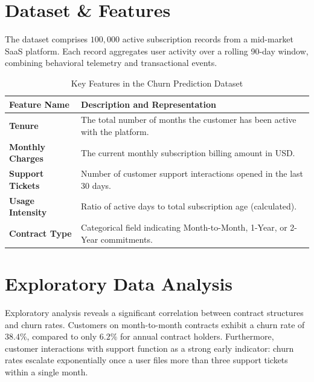 \documentclass[11pt, a4paper]{article}
\begin{document}
\section{Dataset \& Features}
The dataset comprises $100,000$ active subscription records from a mid-market SaaS platform. Each record aggregates user activity over a rolling 90-day window, combining behavioral telemetry and transactional events.

\begin{table}[h]
\centering
\begingroup
\setlength{\parindent}{0pt}
\setlength{\parskip}{0pt}
\caption{Key Features in the Churn Prediction Dataset}
\label{tab:features}
\vspace{0.5em}
\begin{tabularx}{\linewidth}{@{}>{\color{accentdark}\bfseries}l @{\hspace{8mm}} >{\raggedright\arraybackslash}X@{}}
\toprule
Feature Name & Description and Representation \\
\midrule
Tenure & The total number of months the customer has been active with the platform. \\
Monthly Charges & The current monthly subscription billing amount in USD. \\
Support Tickets & Number of customer support interactions opened in the last 30 days. \\
Usage Intensity & Ratio of active days to total subscription age (calculated). \\
Contract Type & Categorical field indicating Month-to-Month, 1-Year, or 2-Year commitments. \\
\bottomrule
\end{tabularx}
\endgroup
\end{table}

\section{Exploratory Data Analysis}
Exploratory analysis reveals a significant correlation between contract structures and churn rates. Customers on month-to-month contracts exhibit a churn rate of $38.4\%$, compared to only $6.2\%$ for annual contract holders. Furthermore, customer interactions with support function as a strong early indicator: churn rates escalate exponentially once a user files more than three support tickets within a single month.
\end{document}
